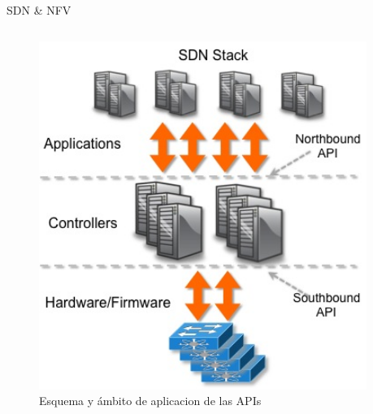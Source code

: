\documentclass[aspectratio=169,xcolor=dvipsnames]{beamer}
\begin{document}
\begin{frame}{SDN \& NFV}
\begin{columns}
            \begin{column}{0.4\textwidth}
                \begin{figure}[h]
                \includegraphics[width=0.95\textwidth]{img/south_north.jpg}
                \caption{Esquema y ámbito de aplicacion de las APIs}
                \end{figure}
            \end{column}
        \end{columns}
	\end{frame}
	
\end{document}
